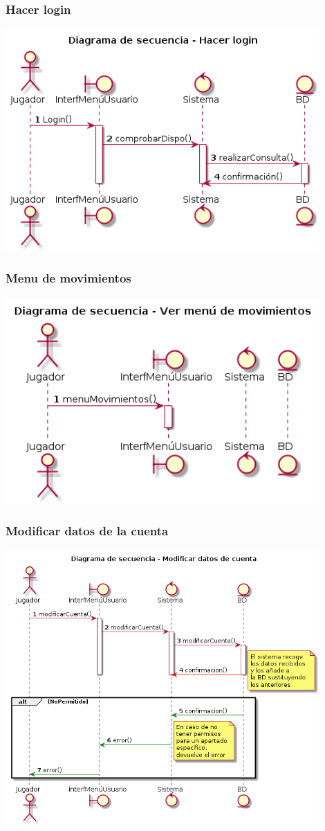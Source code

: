 \subsubsection{Hacer login}
  \includegraphics[width=0.9\textwidth]{./imatges/jugador/Hacer_login.png}
\subsubsection{Menu de movimientos}
  \includegraphics[width=0.9\textwidth]{./imatges/jugador/Menu_de_movimientos.png}
\subsubsection{Modificar datos de la cuenta}
  \includegraphics[width=0.9\textwidth]{./imatges/jugador/Modificar_datos_de_cuenta.png}
